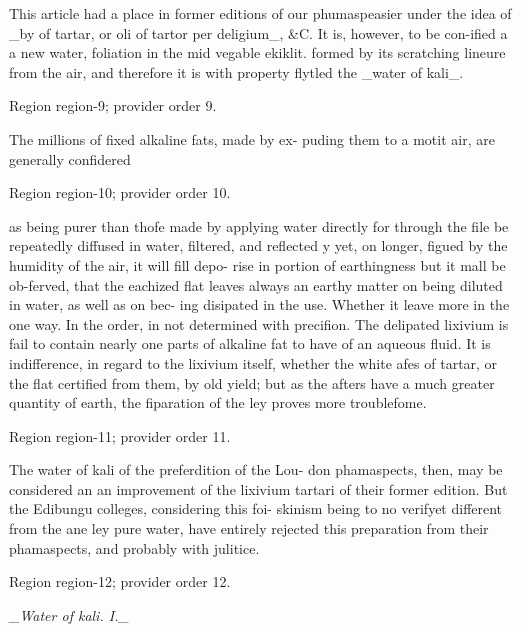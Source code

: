 \documentclass[11pt]{article}
\begin{document}
This article had a place in former editions of our phumaspeasier under the idea of \_by of tartar, or oli of tartor per deligium\_, \&C. It is, however, to be con-ified a a new water, foliation in the mid vegable ekiklit. formed by its scratching lineure from the air, and therefore it is with property flytled the \_water of kali\_.
\par

{\scriptsize\color{gray} Region region-9; provider order 9.\par}
\medskip

The millions of fixed alkaline fats, made by ex- puding them to a motit air, are generally confidered
\par

{\scriptsize\color{gray} Region region-10; provider order 10.\par}
\medskip

as being purer than thofe made by applying water directly for through the file be repeatedly diffused in water, filtered, and reflected y yet, on longer, figued by the humidity of the air, it will fill depo- rise in portion of earthingness but it mall be ob-ferved, that the eachized flat leaves always an earthy matter on being diluted in water, as well as on bec- ing disipated in the use. Whether it leave more in the one way. In the order, in not determined with precifion. The delipated lixivium is fail to contain nearly one parts of alkaline fat to have of an aqueous fluid. It is indifference, in regard to the lixivium itself, whether the white afes of tartar, or the flat certified from them, by old yield; but as the afters have a much greater quantity of earth, the fiparation of the ley proves more troublefome.
\par

{\scriptsize\color{gray} Region region-11; provider order 11.\par}
\medskip

The water of kali of the preferdition of the Lou- don phamaspects, then, may be considered an an improvement of the lixivium tartari of their former edition. But the Edibungu colleges, considering this foi- skinism being to no verifyet different from the ane ley pure water, have entirely rejected this preparation from their phamaspects, and probably with julitice.
\par

{\scriptsize\color{gray} Region region-12; provider order 12.\par}
\medskip

{\small\itshape \_Water of kali. I.\_\par}
\end{document}
